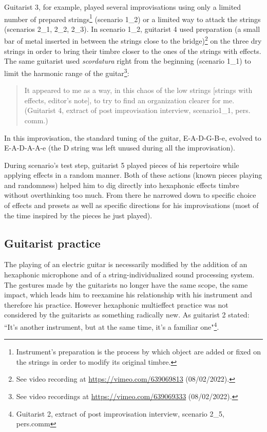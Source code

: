 \documentclass{article}
\begin{document}
Guitarist 3, for example, played several improvisations using only a limited number of prepared strings\footnote{Instrument's preparation is the process by which object are added or fixed on the strings in order to modify its original timbre.} (scenario 1\_2) or a limited way to attack the strings (scenarios 2\_1, 2\_2, 2\_3). In scenario 1\_2, guitarist 4 used preparation (a small bar of metal inserted in between the strings close to the bridge)\footnote{See video recording at \url{https://vimeo.com/639069813} (08/02/2022).} on the three dry strings in order to bring their timbre closer to the ones of the strings with effects. The same guitarist used \textit{scordatura} right from the beginning (scenario 1\_1) to limit the harmonic range of the guitar\footnote{See video recordings at \url{https://vimeo.com/639069333} (08/02/2022).}:
    \begin{quote}
     It appeared to me as a way, in this chaos of the low strings [strings with effects, editor's note], to try to find an organization clearer for me. (Guitarist 4, extract of post improvisation interview, scenario1\_1, pers. comm.)
    \end{quote}
In this improvisation, the standard tuning of the guitar, E-A-D-G-B-e, evolved to E-A-D-A-A-e (the D string was left unused during all the improvisation). 

During scenario's test step, guitarist 5 played pieces of his repertoire while applying effects in a random manner. Both of these actions (known pieces playing and randomness) helped him to dig directly into hexaphonic effects timbre without overthinking too much. From there he narrowed down to specific choice of effects and presets as well as specific directions for his improvisations (most of the time inspired by the pieces he just played). 

\subsection{Guitarist practice}
The playing of an electric guitar is necessarily modified by the addition of an hexaphonic microphone and of a string-individualized sound processing system. The gestures made by the guitarists no longer have the same scope, the same impact, which leads him to reexamine his relationship with his instrument and therefore his practice.
However hexaphonic multieffect practice was not considered by the guitarists as something radically new.  As guitarist 2 stated: ``It's another instrument, but at the same time, it's a familiar one"\footnote{Guitarist 2, extract of post improvisation interview,  scenario 2\_5, pers.comm}. 
\end{document}
